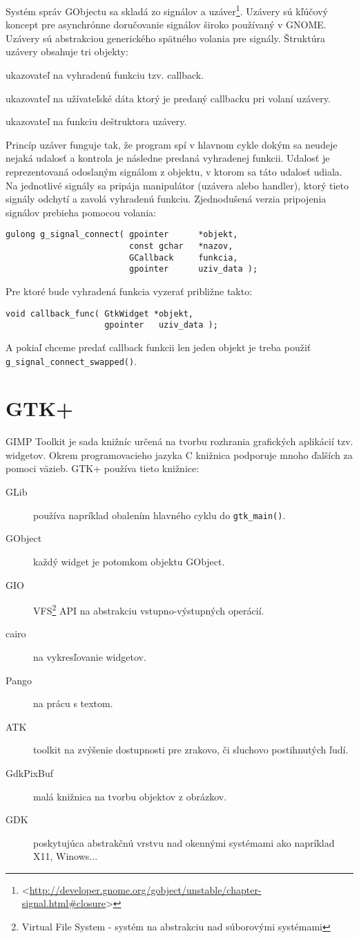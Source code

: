 \documentclass[12pt,oneside,final]{fithesis2}
\begin{document}
Systém správ GObjectu sa skladá zo signálov a uzáver\footnote{<\url{http://developer.gnome.org/gobject/unstable/chapter-signal.html\#closure}>}. Uzávery sú kľúčový koncept pre asynchrónne doručovanie signálov široko používaný v GNOME. Uzávery sú abstrakciou generického spätného volania pre signály. Štruktúra uzávery obsahuje tri objekty:
\begin{description}
\item ukazovateľ na vyhradenú funkciu tzv. callback.
\item ukazovateľ na užívateľské dáta ktorý je predaný callbacku pri volaní uzávery.
\item ukazovateľ na funkciu deštruktora uzávery.
\end{description}
Princíp uzáver funguje tak, že program spí v hlavnom cykle dokým sa neudeje nejaká udalosť a kontrola je následne predaná vyhradenej funkcii. Udalosť je reprezentovaná odoslaným signálom z objektu, v ktorom sa táto udalosť udiala. Na jednotlivé signály sa pripája manipulátor (uzávera alebo handler), ktorý tieto signály odchytí a zavolá vyhradenú funkciu. Zjednodušená verzia pripojenia signálov prebieha pomocou volania:
\begin{verbatim}
gulong g_signal_connect( gpointer      *objekt,
                         const gchar   *nazov,
                         GCallback     funkcia,
                         gpointer      uziv_data );
\end{verbatim} Pre ktoré bude vyhradená funkcia vyzerať približne takto: 
\begin{verbatim}
void callback_func( GtkWidget *objekt,
                    gpointer   uziv_data );
\end{verbatim}
A pokiaľ chceme predať callback funkcii len jeden objekt je treba použiť \verb|g_signal_connect_swapped()|.

\section{GTK+}
GIMP Toolkit je sada knižníc určená na tvorbu rozhrania grafických aplikácií tzv. widgetov. Okrem programovacieho jazyka C knižnica podporuje mnoho ďalších za pomoci väzieb. GTK+ používa tieto knižnice:
\begin{description}
\item[GLib] používa napríklad obalením hlavného cyklu do \verb|gtk_main()|.
\item[GObject] každý widget je potomkom objektu GObject.
\item[GIO] VFS\footnote{Virtual File System - systém na abstrakciu nad súborovými systémami} API na abstrakciu vstupno-výstupných operácií.
\item[cairo] na vykresľovanie widgetov.
\item[Pango] na prácu s textom.
\item[ATK] toolkit na zvýšenie dostupnosti pre zrakovo, či sluchovo postihnutých ľudí.
\item[GdkPixBuf] malá knižnica na tvorbu objektov z obrázkov.
\item[GDK] poskytujúca abstrakčnú vrstvu nad okennými systémami ako napríklad X11, Winows...
\end{description}
\end{document}
